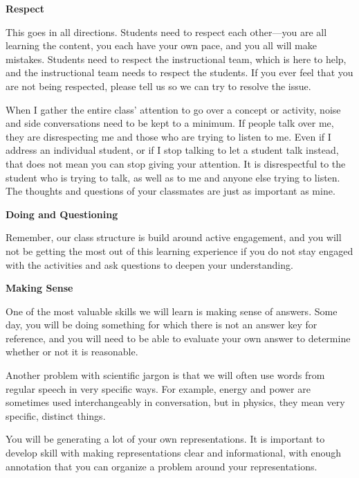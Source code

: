 \documentclass[]{article}
\begin{document}
\begin{TeacherMargin}
\noindent\textbf{Respect}

This goes in all directions. Students need to respect each other---you are all learning the content, you each have your own pace, and you all will make mistakes. Students need to respect the instructional team, which is here to help, and the instructional team needs to respect the students. If you ever feel that you are not being respected, please tell us so we can try to resolve the issue.

When I gather the entire class' attention to go over a concept or activity, noise and side conversations need to be kept to a minimum. If people talk over me, they are disrespecting me and those who are trying to listen to me. Even if I address an individual student, or if I stop talking to let a student talk instead, that does not mean you can stop giving your attention. It is disrespectful to the student who is trying to talk, as well as to me and anyone else trying to listen. The thoughts and questions of your classmates are just as important as mine.

\noindent\textbf{Doing and Questioning}

Remember, our class structure is build around active engagement, and you will not be getting the most out of this learning experience if you do not stay engaged with the activities and ask questions to deepen your understanding.

\noindent\textbf{Making Sense}

One of the most valuable skills we will learn is making sense of answers. Some day, you will be doing something for which there is not an answer key for reference, and you will need to be able to evaluate your own answer to determine whether or not it is reasonable.

Another problem with scientific jargon is that we will often use words from regular speech in very specific ways. For example, energy and power are sometimes used interchangeably in conversation, but in physics, they mean very specific, distinct things.

You will be generating a lot of your own representations. It is important to develop skill with making representations clear and informational, with enough annotation that you can organize a problem around your representations.
\end{TeacherMargin}
\end{document}
